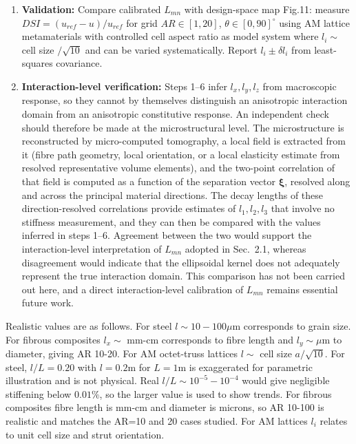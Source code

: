 \documentclass[final,3p,times,fleqn]{elsarticle}
\newcommand{\revtwo}[1]{\textcolor{revtwocolor}{#1}}
\begin{document}
\begin{enumerate}
  \item \textbf{Validation:} Compare calibrated $L_{mn}$ with design-space map Fig.11: measure $DSI=(u_{ref}-u)/u_{ref}$ for grid $AR\in[1,20]$, $\theta\in[0,90]^\circ$ using AM lattice metamaterials with controlled cell aspect ratio as model system where $l_i\sim$ cell size $/\sqrt{10}$ and can be varied systematically. Report $l_i\pm \delta l_i$ from least-squares covariance.

  \item \revtwo{\textbf{Interaction-level verification:} Steps 1--6 infer
  $l_{x},l_{y},l_{z}$ from macroscopic response, so they cannot by
  themselves distinguish an anisotropic interaction domain from an
  anisotropic constitutive response. An independent check should
  therefore be made at the microstructural level. The microstructure is
  reconstructed by micro-computed tomography, a local field is extracted
  from it (fibre path geometry, local orientation, or a local elasticity
  estimate from resolved representative volume elements), and the
  two-point correlation of that field is computed as a function of the
  separation vector $\boldsymbol{\xi}$, resolved along and across the
  principal material directions. The decay lengths of these
  direction-resolved correlations provide estimates of $l_{1},l_{2},l_{3}$
  that involve no stiffness measurement, and they can then be compared
  with the values inferred in steps 1--6. Agreement between the two would
  support the interaction-level interpretation of $L_{mn}$ adopted in
  Sec.~2.1, whereas disagreement would
  indicate that the ellipsoidal kernel does not adequately represent the
  true interaction domain. This comparison has not been carried out here,
  and a direct interaction-level calibration of $L_{mn}$ remains essential
  future work.}
\end{enumerate}

Realistic values are as follows. For steel $l\sim10-100\mu$m corresponds to grain size. For fibrous composites $l_x\sim$ mm-cm corresponds to fibre length and $l_y\sim\mu$m to diameter, giving AR 10-20. For AM octet-truss lattices $l\sim$ cell size $a/\sqrt{10}$. For steel, $l/L=0.20$ with $l=0.2$m for $L=1$m is exaggerated for parametric illustration and is not physical. Real $l/L\sim10^{-5}-10^{-4}$ would give negligible stiffening below $0.01\%$, so the larger value is used to show trends. For fibrous composites fibre length is mm-cm and diameter is microns, so AR 10-100 is realistic and matches the AR=10 and 20 cases studied. For AM lattices $l_i$ relates to unit cell size and strut orientation.
\end{document}
